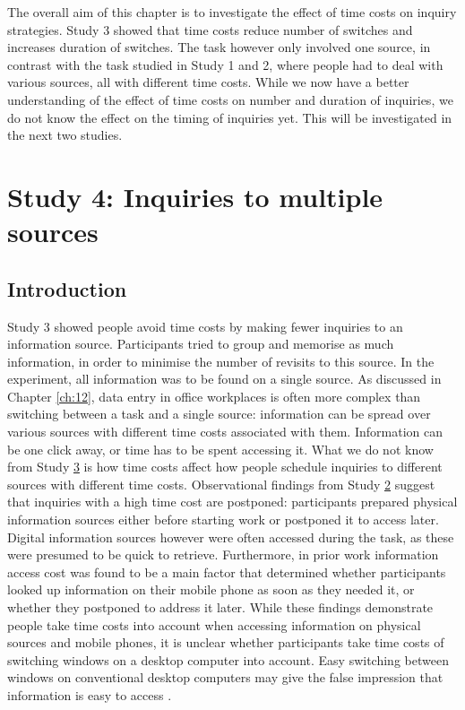 The overall aim of this chapter is to investigate the effect of time costs on inquiry strategies. Study 3 showed that time costs reduce number of switches and increases duration of switches. The task however only involved one source, in contrast with the task studied in Study 1 and 2, where people had to deal with various sources, all with different time costs. While we now have a better understanding of the effect of time costs on number and duration of inquiries, we do not know the effect on the timing of inquiries yet. This will be investigated in the next two studies.


\section{Study 4: Inquiries to multiple sources}\label{st:Study4}
 
\subsection{Introduction}
Study 3 showed people avoid time costs by making fewer inquiries to an information source. Participants tried to group and memorise as much information, in order to minimise the number of revisits to this source. In the experiment, all information was to be found on a single source. As discussed in Chapter \ref{ch:12}, data entry in office workplaces is often more complex than switching between a task and a single source: information can be spread over various sources with different time costs associated with them. Information can be one click away, or time has to be spent accessing it. What we do not know from Study \hyperref[st:Study3]{3} is how time costs affect how people schedule inquiries to different sources with different time costs. Observational findings from Study \hyperref[st:Study2]{2} suggest that inquiries with a high time cost are postponed: participants prepared physical information sources either before starting work or postponed it to access later. Digital information sources however were often accessed during the task, as these were presumed to be quick to retrieve. Furthermore, in prior work \citep{Sohn2008} information access cost was found to be a main factor that determined whether participants looked up information on their mobile phone as soon as they needed it, or whether they postponed to address it later. While these findings demonstrate people take time costs into account when accessing information on physical sources and mobile phones, it is unclear whether participants take time costs of switching windows on a desktop computer into account. Easy switching between windows on conventional desktop computers may give the false impression that information is easy to access \citep{Sellen2003}. 

